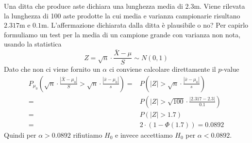 \begin{example}
	Una ditta che produce aste dichiara una lunghezza media di $2.3$m. Viene rilevata la lunghezza
	di 100 aste prodotte la cui media e varianza campionarie risultano $2.317$m e $0.1$m.
	L'affermazione dichiarata dalla ditta è plausibile o no? Per capirlo formuliamo un test per
	la media di un campione grande con varianza non nota, usando la statistica
	\[ Z = \sqrt{n} \cdot \frac{\bar{X} - \mu}{S} \sim N(0, 1) \]
	Dato che non ci viene fornito un $\alpha$ ci conviene calcolare direttamente il $p$-value
	\begin{align*}
		P_{\mu_0} \left( \sqrt{n} \cdot \frac{|\bar{X} - \mu_0|}{S} >
		\sqrt{n} \cdot \frac{|\bar{x} - \mu_0|}{s} \right) = &
		P \left( |Z| > \sqrt{n} \cdot \frac{|\bar{x} - \mu_0|}{s} \right)                         \\
		=                                                    &
		P \left( |Z| > \sqrt{100} \cdot \frac{|2.317 - 2.3|}{0.1} \right)                         \\
		=                                                    & P \left( |Z| > 1.7 \right)         \\
		=                                                    & 2 \cdot (1 - \Phi (1.7) ) = 0.0892
	\end{align*}
	Quindi per $\alpha > 0.0892$ rifiutiamo $H_0$ e invece accettiamo $H_0$ per $\alpha < 0.0892$.
\end{example}